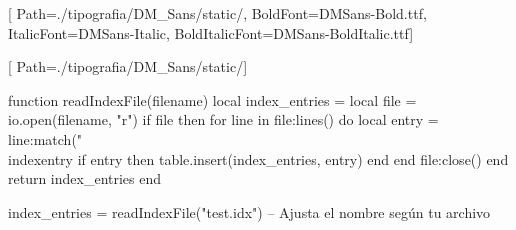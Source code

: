 \usepackage{fontspec} %

\usepackage{multicol} %

\usepackage{luacode} %

\usepackage{imakeidx} %
\makeindex

\setmainfont{DMSans-Regular}[
    Path=./tipografia/DM_Sans/static/,
    BoldFont=DMSans-Bold.ttf,
    ItalicFont=DMSans-Italic,
    BoldItalicFont=DMSans-BoldItalic.ttf]

\newfontfamily{}[
    Path=./tipografia/DM_Sans/static/]
  
\newcommand{\textlight}[1]{{\lightfont #1}}

\begin{luacode*}
    function readIndexFile(filename)
      local index_entries = {}
      local file = io.open(filename, "r")
      if file then
        for line in file:lines() do
          local entry = line:match("\\indexentry%
          if entry then
            table.insert(index_entries, entry)
          end
        end
        file:close()
      end
      return index_entries
    end
    
    index_entries = readIndexFile("test.idx")  -- Ajusta el nombre según tu archivo
\end{luacode*}
    

